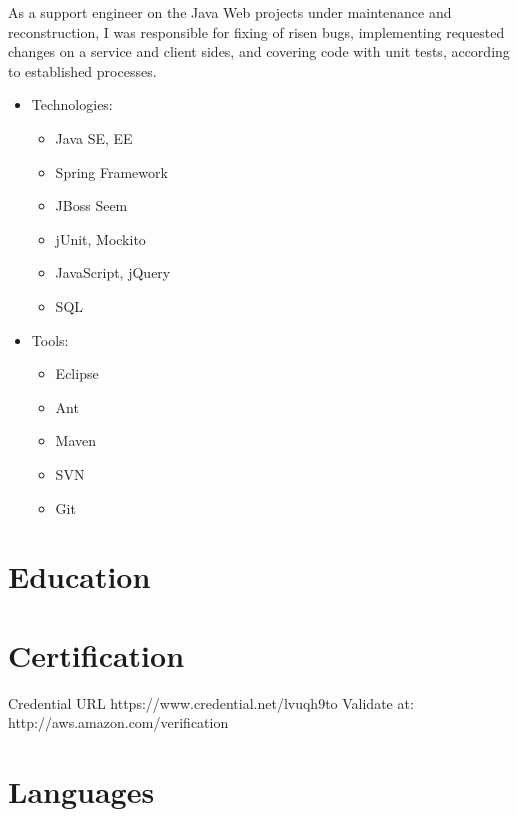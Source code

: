 \documentclass[11pt, a4paper]{moderncv}
\begin{document}
{As a support engineer on the Java Web projects under maintenance and reconstruction, I was responsible for fixing of risen bugs, implementing requested changes on a service and client sides, and covering code with unit tests, according to established processes.
\begin{itemize}
\item Technologies:
\begin{itemize}
\item Java SE, EE
\item Spring Framework
\item JBoss Seem
\item jUnit, Mockito
\item JavaScript, jQuery
\item SQL
\end{itemize}
\item Tools:
\begin{itemize}
\item Eclipse
\item Ant
\item Maven
\item SVN
\item Git
\end{itemize}
\end{itemize}}


\section{Education}
{}
{}



\section{Certification}
{Credential URL https://www.credential.net/lvuqh9to}
{Validate at: http://aws.amazon.com/verification}

\section{Languages}
\end{document}
